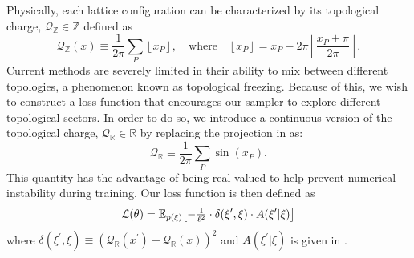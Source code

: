 \documentclass{article} %
\begin{document}
Physically, each lattice configuration can be characterized by its topological charge, \(\mathcal{Q}_{\mathbb{Z}}\in\mathbb{Z}\) defined as
%
\begin{equation*}
      \mathcal{Q}_{\mathbb{Z}}(x) \equiv \frac{1}{2\pi}\sum_{P}\left\lfloor x_{P}\right\rfloor,
   \quad\text{where}\quad \left\lfloor x_{P}\right\rfloor = x_{P} -
   2\pi\left\lfloor\frac{x_{P}+\pi}{2\pi}\right\rfloor.
   \label{eq:intcharge}
\end{equation*}
%
Current methods are severely limited in their ability to mix between different topologies, a phenomenon known as topological freezing.
%
Because of this, we wish to construct a loss function that encourages our sampler to explore different topological sectors.
%
In order to do so, we introduce a continuous version of the topological charge, \(\mathcal{Q}_{\mathbb{R}}\in\mathbb{R}\) by replacing the projection in  as:
%
\begin{equation}
    \mathcal{Q}_{\mathbb{R}} \equiv \frac{1}{2\pi}\sum_{P}\sin(x_{P}).
    \label{eq:sincharge}
\end{equation}
%
This quantity has the advantage of being real-valued to help prevent numerical instability during training.
%
Our loss function is then defined as
%
\begin{equation}
   \mathcal{L}(\theta) = \mathbb{E}_{p(\xi)}{%
      \left[-\tfrac{1}{\ell^{2}}\cdot\delta(\xi^{\prime}, \xi)\cdot A(\xi^{\prime}|\xi)\right]
   }
\end{equation}
%
%
where \(\delta(\xi^{\prime}, \xi) \equiv {\left(\mathcal{Q}_{\mathbb{R}}(x^{\prime}) - \mathcal{Q}_{\mathbb{R}}(x)\right)}^{2}\) and \(A(\xi^{\prime}|\xi)\) is given in .
\end{document}
